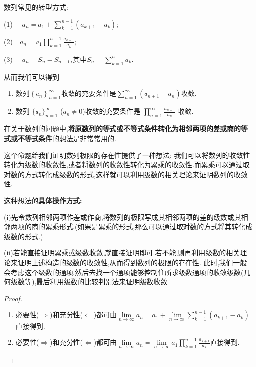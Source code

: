 \documentclass[../../main.tex]{subfiles}%
\begin{document}
\begin{proposition}[数列常见的转型方式]\label{proposition:数列收敛的级数与累乘形式}
数列常见的转型方式:

(1) $\quad a_n = a_1 + \sum_{k=1}^{n-1} \left( a_{k+1} - a_k \right); $

(2)$ \quad a_n = a_1 \prod_{k=1}^{n-1} \frac{a_{k+1}}{a_k}$; 

(3) $\quad a_n = S_n - S_{n-1}, \text{其中} S_n = \sum_{k=1}^n a_k.$

从而我们可以得到
\begin{enumerate}
\item 数列$\left\{ a_n \right\} _{n=1}^{\infty}$收敛的充要条件是$\sum\limits_{n=1}^{\infty}{\left( a_{n+1}-a_n \right)}$收敛.

\item 数列 \(\{ a_n \}_{n = 1}^{\infty}\) (\(a_n\neq 0\))收敛的充要条件是 \(\prod_{n = 1}^{\infty} \frac{a_{n + 1}}{a_n}\) 收敛.
\end{enumerate}
\end{proposition}
\begin{remark}
在关于数列的问题中,\textbf{将原数列的等式或不等式条件转化为相邻两项的差或商的等式或不等式条件}的想法是非常常用的.
\end{remark}
\begin{note}
这个命题给我们证明数列极限的存在性提供了一种想法:
我们可以将数列的收敛性转化为级数的收敛性,或者将数列的收敛性转化为累乘的收敛性.而累乘可以通过取对数的方式转化成级数的形式,这样就可以利用级数的相关理论来证明数列的收敛性.

这种想法的\textbf{具体操作方式:}

(i)先令数列相邻两项作差或作商,将数列的极限写成其相邻两项的差的级数或其相邻两项的商的累乘形式.(如果是累乘的形式,那么可以通过取对数的方式将其转化成级数的形式.)

(ii)若能直接证明累乘或级数收敛,就直接证明即可.若不能,则再利用级数的相关理论来证明上述构造的级数的收敛性,从而得到数列的极限的存在性.
此时,我们一般会考虑这个级数的通项,然后去找一个通项能够控制住所求级数通项的收敛级数(几何级数等),最后利用级数的比较判别法来证明级数收敛
\end{note}
\begin{proof}
\begin{enumerate}
\item 必要性($\Rightarrow$)和充分性($\Leftarrow$)都可由$\underset{n\rightarrow \infty}{\lim}a_n=a_1+\underset{n\rightarrow \infty}{\lim}\sum_{k=1}^{n-1}{\left( a_{k+1}-a_k \right)}$直接得到.

\item 必要性($\Rightarrow$)和充分性($\Leftarrow$)都可由$\underset{n\rightarrow \infty}{\lim}a_n=\underset{n\rightarrow \infty}{\lim}a_1\prod_{k=1}^{n-1}{\frac{a_{k+1}}{a_k}}$直接得到.
\end{enumerate}

\end{proof}
\end{document}
